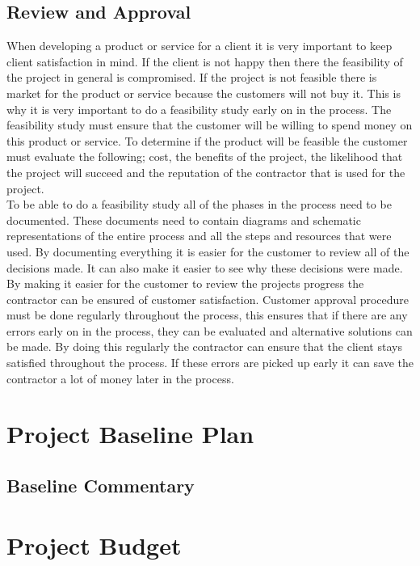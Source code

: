 \subsection{Review and Approval} 

When developing a product or service for a client it is very important to keep client satisfaction in mind. If the client is not happy then there the feasibility of the project in general is compromised. If the project is not feasible there is market for the product or service because the customers will not buy it. This is why it is very important to do a feasibility study early on in the process. The feasibility study must ensure that the customer will be willing to spend money on this product or service. To determine if the product will be feasible the customer must evaluate the following; cost, the benefits of the project, the likelihood that the project will succeed and the reputation of the contractor that is used for the project.\\

\noindent
To be able to do a feasibility study all of the phases in the process need to be documented. These documents need to contain diagrams and schematic representations of the entire process and all the steps and resources that were used. By documenting everything it is easier for the customer to review all of the decisions made. It can also make it easier to see why these decisions were made. By making it easier for the customer to review the projects progress the contractor can be ensured of customer satisfaction. Customer approval procedure must be done regularly throughout the process, this ensures that if there are any errors early on in the process, they can be evaluated and alternative solutions can be made. By doing this regularly the contractor can ensure that the client stays satisfied throughout the process. If these errors are picked up early it can save the contractor a lot of money later in the process.

\section{Project Baseline Plan}
\subsection{Baseline Commentary}

\section{Project Budget}

